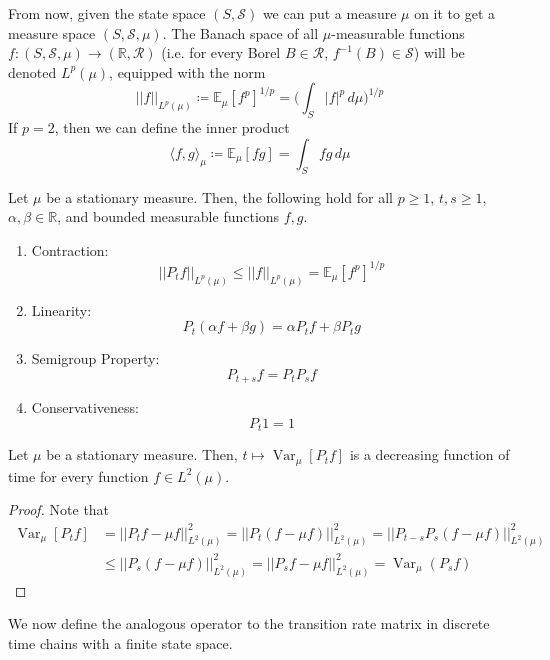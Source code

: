 \documentclass{article}
\DeclareMathOperator{\Var}{Var}
\begin{document}
From now, given the state space $(S, \mathcal{S})$ we can put a measure $\mu$ on it to get a measure space $(S, \mathcal{S}, \mu)$. The Banach space of all $\mu$-measurable functions $f: (S, \mathcal{S}, \mu) \rightarrow (\mathbb{R}, \mathcal{R})$ (i.e. for every Borel $B \in \mathcal{R}$, $f^{-1}(B) \in \mathcal{S}$) will be denoted $L^p (\mu)$, equipped with the norm 
\[||f||_{L^p(\mu)} \coloneqq \mathbb{E}_\mu [f^p]^{1/p} = \bigg( \int_S |f|^p \,d\mu \bigg)^{1/p}\]
If $p = 2$, then we can define the inner product 
\[\langle f, g \rangle_\mu \coloneqq \mathbb{E}_\mu [f g] = \int_S f g \, d\mu\]

\begin{lemma}
Let $\mu$ be a stationary measure. Then, the following hold for all $p \geq 1$, $t, s \geq 1$, $\alpha, \beta \in \mathbb{R}$, and bounded measurable functions $f, g$. 
\begin{enumerate}
    \item Contraction: 
    \[||P_t f||_{L^p(\mu)} \leq ||f||_{L^p (\mu)} = \mathbb{E}_\mu [f^p]^{1/p}\]
    
    \item Linearity: 
    \[P_t (\alpha f + \beta g) = \alpha P_t f + \beta P_t g\] 
    
    \item Semigroup Property: 
    \[P_{t + s} f = P_t P_s f\]
    
    \item Conservativeness: 
    \[P_t 1 = 1\]
\end{enumerate}
\end{lemma}

\begin{lemma}
Let $\mu$ be a stationary measure. Then, $t \mapsto \Var_\mu [P_t f]$ is a decreasing function of time for every function $f \in L^2 (\mu)$. 
\end{lemma}
\begin{proof}
Note that 
\begin{align*}
    \Var_\mu [P_t f] & = ||P_t f - \mu f||^2_{L^2(\mu) } =  ||P_t (f - \mu f)||^2_{L^2 (\mu)} = ||P_{t - s} P_s (f - \mu f)||^2_{L^2 (\mu)} \\
    & \leq ||P_s (f - \mu f)||^2_{L^2 (\mu)} = ||P_s f - \mu f||^2_{L^2 (\mu)} = \Var_\mu (P_s f)
\end{align*}
\end{proof}

We now define the analogous operator to the transition rate matrix in discrete time chains with a finite state space. 
\end{document}
